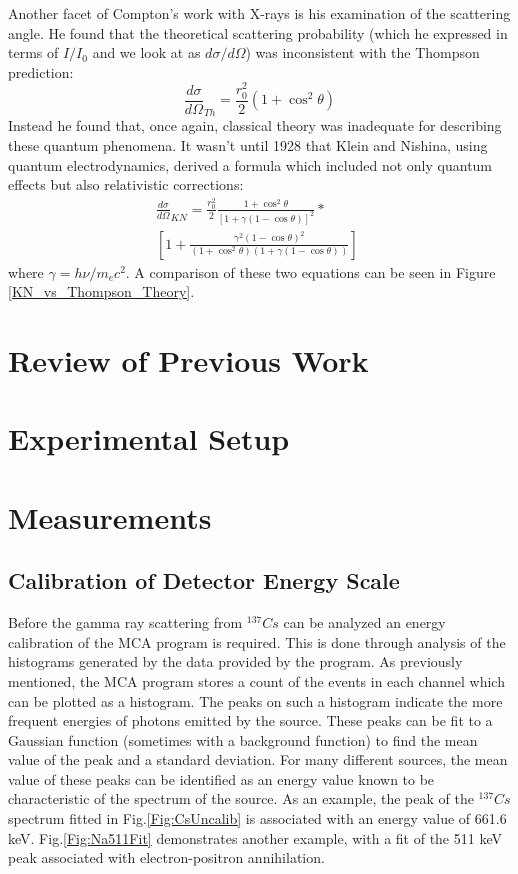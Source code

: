\documentclass[%
 reprint,
 amsmath,amssymb,
 aps,
 pra,
]{revtex4-1}
\begin{document}
Another facet of Compton's work with X-rays is his examination of the scattering angle. He found that the theoretical scattering probability (which he expressed in terms of $I/I_0$ and we look at as $d\sigma / d\Omega$) was inconsistent with the Thompson prediction:
\begin{equation}\label{eq:thompson}
	\frac{d \sigma}{d \Omega}_{Th} = \frac{r_0^2}{2}(1+\cos^2{\theta})
\end{equation}
Instead he found that, once again, classical theory was inadequate for describing these quantum phenomena. It wasn't until 1928 that Klein and Nishina, using quantum electrodynamics, derived a formula which included not only quantum effects but also relativistic corrections:
\begin{gather}
	\frac{d \sigma}{d \Omega}_{KN} = \frac{r_0^2}{2} \frac{1 + \cos^2{\theta}}{[1 + \gamma(1 - \cos{\theta})]^2} \nonumber * ~~~~~~~~~~~~ \\
	\left[ 1 + \frac{\gamma^2(1 - \cos{\theta})^2}{(1 + \cos^2{\theta})(1+ \gamma(1 - \cos{\theta}))}\right] 
	\label{eq:kn}
\end{gather}
where $\gamma = h\nu / m_e c^2$. A comparison of these two equations can be seen in Figure \ref{KN_vs_Thompson_Theory}.

\section{Review of Previous Work}

\section{Experimental Setup}

\section{Measurements}

\subsection{Calibration of Detector Energy Scale}
Before the gamma ray scattering from $^{137}Cs$ can be analyzed an energy calibration of the MCA program is required. This is done through analysis of the histograms generated by the data provided by the program. As previously mentioned, the MCA program stores a count of the events in each channel which can be plotted as a histogram. The peaks on such a histogram indicate the more frequent energies of photons emitted by the source. These peaks can be fit to a Gaussian function (sometimes with a background function) to find the mean value of the peak and a standard deviation. For many different sources, the mean value of these peaks can be identified as an energy value known to be characteristic of the spectrum of the source. As an example, the peak of the $^{137}Cs$ spectrum fitted in Fig.\ref{Fig:CsUncalib} is associated with an energy value of 661.6 keV. Fig.\ref{Fig:Na511Fit} demonstrates another example, with a fit of the 511 keV peak associated with electron-positron annihilation.
\end{document}
